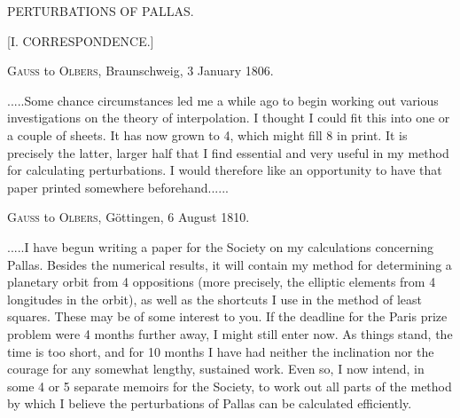 \clearpage
\thispagestyle{empty}
\vspace*{1.6in}
\begin{center}{\Large PERTURBATIONS OF PALLAS.\par}\end{center}
\clearpage
{}
\begin{center}
{\large [I. CORRESPONDENCE.]\par}
\bigskip
{}
\textsc{Gauss} to \textsc{Olbers}, Braunschweig, 3 January 1806.
\end{center}
\noindent\hspace*{\parindent}.\quad.\quad.\quad.\quad.\quad Some chance circumstances led me a while ago to begin working out various investigations on the theory of interpolation\HistoricalNoteEight{See vol. III, p. 265.]}. I thought I could fit this into one or a couple of sheets. It has now grown to 4, which might fill 8 in print. It is precisely the latter, larger half that I find essential and very useful in my method for calculating perturbations. I would therefore like an opportunity to have that paper printed somewhere beforehand.\quad.\quad.\quad.\quad.\quad.
\par\bigskip
\begin{center}
\textsc{Gauss} to \textsc{Olbers}, Göttingen, 6 August 1810.
\end{center}
\noindent\hspace*{\parindent}.\quad.\quad.\quad.\quad.\quad I have begun writing a paper\HistoricalNoteDouble{See vol. VI, p. 1.]} for the Society on my calculations concerning Pallas. Besides the numerical results, it will contain my method for determining a planetary orbit from 4 oppositions (more precisely, the elliptic elements from 4 longitudes in the orbit), as well as the shortcuts I use in the method of least squares. These may be of some interest to you. If the deadline for the Paris prize problem were 4 months further away, I might still enter now. As things stand, the time is too short, and for 10 months I have had neither the inclination nor the courage for any somewhat lengthy, sustained work. Even so, I now intend, in some 4 or 5 separate memoirs for the Society, to work out all parts of the method by which I believe the perturbations of Pallas can be calculated efficiently.
